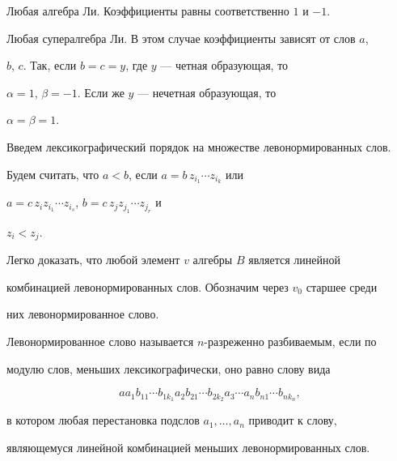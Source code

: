 \begin{exam}


Любая алгебра Ли. Коэффициенты равны соответственно $1$ и $-1$.


\end{exam}





\begin{exam}


Любая супералгебра Ли. В этом случае коэффициенты зависят от слов $a$,


$b$, $c$. Так, если $b=c=y$, где $y$ --- четная образующая, то


$\alpha=1$, $\beta=-1$. Если же $y$ --- нечетная образующая, то


$\alpha=\beta=1$.


\end{exam}





Введем лексикографический порядок на множестве левонормированных слов.


Будем считать, что $a<b$, если $a=b\,z_{i_1}\dotsb z_{i_k}$ или


$a=c\,z_i z_{i_1}\dotsb z_{i_s}$, $b=c\,z_j z_{j_1}\dotsb z_{j_r}$ и


$z_i<z_j$.





Легко доказать, что любой элемент $v$ алгебры $B$ является линейной


комбинацией левонормированных слов. Обозначим через $v_0$ старшее среди


них левонормированное слово.





\begin{defnonum}


Левонормированное слово называется $n$-разреженно разбиваемым, если по


модулю слов, меньших лексикографически, оно равно слову вида


\begin{equation}


a a_1 b_{11}\dotsb b_{1k_1}a_2 b_{21}\dotsb


b_{2k_2}a_3\dotsb a_n b_{n1}\dotsb b_{n k_n},


\end{equation}


в котором любая перестановка подслов $a_1,\dotsc,a_n$ приводит к слову,


являющемуся линейной комбинацией меньших левонормированных слов.


\end{defnonum}





